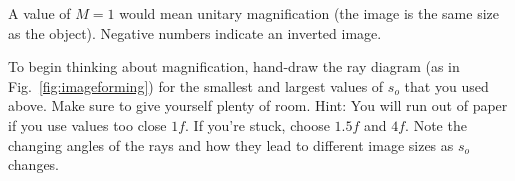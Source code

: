 \documentclass[a4paper]{report}
\begin{document}
A value of $M=1$ would mean unitary magnification (the image is the same size as the object). 
Negative numbers indicate an inverted image.

To begin thinking about magnification, hand-draw the ray diagram (as in Fig.~\ref{fig:imageforming}) for the smallest and largest values of $s_o$ that you used above. 
Make sure to give yourself plenty of room. 
Hint: You will run out of paper if you use values too close $1f$.
If you're stuck, choose $1.5f$ and $4f$.
Note the changing angles of the rays and how they lead to different image sizes as $s_o$ changes. 
%
%
%


\end{document}
